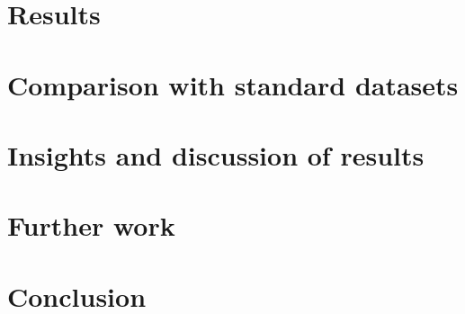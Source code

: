 \documentclass[12pt, twoside, a4paper]{article}
\begin{document}
\section{Results}

\section{Comparison with standard datasets}

\section{Insights and discussion of results}

\section{Further work}

\section{Conclusion}
\end{document}
